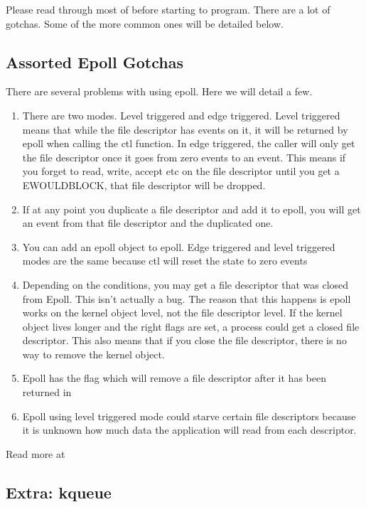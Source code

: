 Please read through most of  before starting to program.
There are a lot of gotchas.
Some of the more common ones will be detailed below.

\subsection{Assorted Epoll Gotchas}

There are several problems with using epoll. Here we will detail a few.

\begin{enumerate}
\item There are two modes. Level triggered and edge triggered. Level triggered means that while the file descriptor has events on it, it will be returned by epoll when calling the ctl function. In edge triggered, the caller will only get the file descriptor once it goes from zero events to an event.
  This means if you forget to read, write, accept etc on the file descriptor until you get a EWOULDBLOCK, that file descriptor will be dropped.
\item If at any point you duplicate a file descriptor and add it to epoll, you will get an event from that file descriptor and the duplicated one.
\item You can add an epoll object to epoll. Edge triggered and level triggered modes are the same because ctl will reset the state to zero events
\item Depending on the conditions, you may get a file descriptor that was closed from Epoll. This isn't actually a bug. The reason that this happens is epoll works on the kernel object level, not the file descriptor level.
  If the kernel object lives longer and the right flags are set, a process could get a closed file descriptor.
  This also means that if you close the file descriptor, there is no way to remove the kernel object.
\item Epoll has the  flag which will remove a file descriptor after it has been returned in 
\item Epoll using level triggered mode could starve certain file descriptors because it is unknown how much data the application will read from each descriptor.
\end{enumerate}

Read more at 

\subsection{Extra: kqueue}

